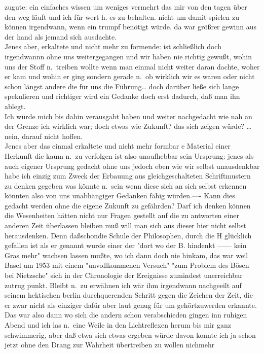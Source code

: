 \documentclass[
]{article}
\begin{document}
zugute: ein einfaches wissen um weniges vermehrt das mir von den tagen
über den weg läuft und ich für wert h. es zu behalten. nicht um damit
spielen zu können irgendwann, wenn ein trumpf benötigt würde. da war
größrer gewinn aus der hand als jemand sich ausdachte.\\
Jenes aber, erkaltete und nicht mehr zu formende: ist schließlich doch
irgendwannn ohne uns weitergegangen und wir haben nie richtig gewußt,
wohin uns der Stoff n.~treiben wollte wenn man einmal nicht weiter daran
dachte, woher er kam und wohin er ging sondern gerade n.~ob wirklich wir
es waren oder nicht schon längst andere die für uns die Führung\ldots{}
doch darüber ließe sich lange spekulieren und richtiger wird ein Gedanke
doch erst dadurch, daß man ihn ablegt.\\
Ich würde mich bis dahin verausgabt haben und weiter nachgedacht wie nah
an der Grenze ich wirklich war; doch etwas wie Zukunft? das sich zeigen
würde? \ldots nein, darauf nicht hoffen.\\
Jenes aber das einmal erkaltete und nicht mehr formbar e Material einer
Herkunft die kaum n.~zu verfolgen ist also unaufhebbar sein Ursprung:
jenes als auch eigener Ursprung gedacht ohne uns jedoch eben wie wir
selbst unausdenkbar habe ich einzig zum Zweck der Erbauung aus
gleichgeschalteten Schriftmustern zu denken gegeben was könnte n.~sein
wenn diese sich an sich selbst erkennen könnten also von uns
unabhängiger Gedanken fähig würden.---- Kann dies gedacht werden ohne
die eigene Zukunft zu gefährden? Darf ich denken können die Wesenheiten
hätten nicht nur Fragen gestellt auf die zu antworten einer anderen Zeit
überlassen bleiben muß will man sich aus dieser hier nicht selbst
herausdenken. Denn daßschondie Schule der Philosophen, durch die H
glücklich gefallen ist als er genannt wurde einer der "dort wo der B.
hindenkt ------ kein Gras mehr" wachsen lassen mußte, wo ich dann doch
nie hinkam, das war weil Basel um 1953 mit einem "unvollkommenen
Versuch" "zum Problem des Bösen bei Nietzsche" sich in der Chronologie
der Ereignisse zumindest unerreichbar zutrug punkt. Bleibt n.~zu
erwähnen ich wär ihm irgendwann nachgeeilt auf seinem hektischen berlin
durchquerenden Schritt gegen die Zeichen der Zeit, die er zwar nicht als
einziger dafür aber laut genug für um gehörtzuwerden erkannte. Das war
also dann wo sich die andern schon verabschieden gingen inn ruhigen
Abend und ich las n.~eine Weile in den Lichtreflexen herum bis mir ganz
schwimmerig, aber daß etwa sich etwas ergeben würde davon konnte ich ja
schon jetzt ohne den Drang zur Wahrheit übertreiben zu wollen nichmehr
\end{document}

